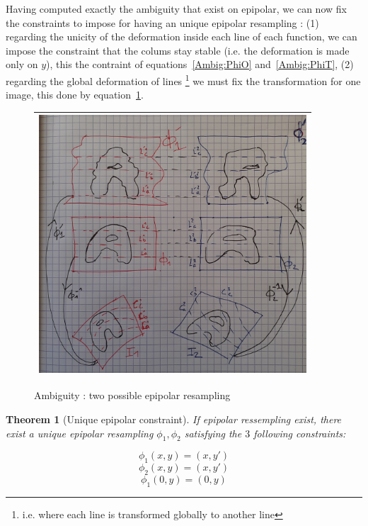 \documentclass[a4paper]{article}
\newtheorem{theorem}{Theorem}
\begin{document}
Having computed exactly the ambiguity that exist on epipolar, we can now fix the constraints to impose 
for having an unique epipolar resampling : (1) regarding the unicity  of the deformation
inside each line of each function, we can impose the constraint that the colums stay stable (i.e.
the deformation is made only on  $y$), this the contraint of equations~\ref{Ambig:PhiO}
and~\ref{Ambig:PhiT}, (2) regarding the global deformation of lines \footnote{i.e. where each line
is transformed globally to another line} we must fix the transformation  for one image,
this done by equation~\ref{FigAmbigEpip}.

\begin{figure}
\centering
\begin{tabular}{||c||}
 \hline \hline
\includegraphics[width=10cm]{FIGS/AmbigEpip.jpg}
 \\ \hline \hline
\end{tabular}
\caption{Ambiguity : two possible epipolar resampling}
\label{FigAmbigEpip}
\end{figure}




\begin{theorem}[Unique epipolar constraint]

If epipolar ressempling exist, there exist a unique epipolar resampling $\phi_1,\phi_2$ satisfying 
the $3$ following constraints:

\begin{equation}
    \phi_1(x,y) = (x,y') \label{Ambig:PhiO}
\end{equation}
\begin{equation}
    \phi_2(x,y) = (x,y') \label{Ambig:PhiT}
\end{equation}
\begin{equation}
    \phi_1(0,y) = (0,y) \label{Ambig:Line}
\end{equation}
\label{Theo:Fix:Ambig}

\end{theorem}
\end{document}
